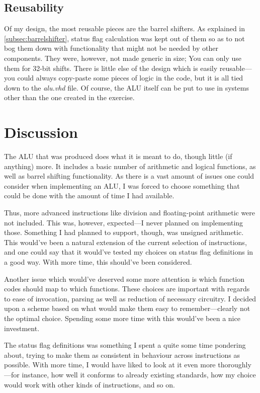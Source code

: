 \documentclass{article}
\begin{document}
\subsection{Reusability}
\label{subsec:reusability}
Of my design, the most reusable pieces are the barrel shifters. As explained in \autoref{subsec:barrelshifter}, status flag calculation was kept out of them so as to not bog them down with functionality that might not be needed by other components. They were, however, not made generic in size; You can only use them for 32-bit shifts. There is little else of the design which is easily reusable---you could always copy-paste some pieces of logic in the code, but it is all tied down to the {\em alu.vhd} file. Of course, the ALU itself can be put to use in systems other than the one created in the exercise.

\section{Discussion}
\label{sec:discussion}
The ALU that was produced does what it is meant to do, though little (if anything) more. It includes a basic number of arithmetic and logical functions, as well as barrel shifting functionality. As there is a vast amount of issues one could consider when implementing an ALU, I was forced to choose something that could be done with the amount of time I had available. 

Thus, more advanced instructions like division and floating-point arithmetic were not included. This was, however, expected---I never planned on implementing those. Something I had planned to support, though, was unsigned arithmetic. This would've been a natural extension of the current selection of instructions, and one could say that it would've tested my choices on status flag definitions in a good way. With more time, this should've been considered.

Another issue which would've deserved some more attention is which function codes should map to which functions. These choices are important with regards to ease of invocation, parsing as well as reduction of necessary circuitry. I decided upon a scheme based on what would make them easy to remember---clearly not the optimal choice. Spending some more time with this would've been a nice investment.

The status flag definitions was something I spent a quite some time pondering about, trying to make them as consistent in behaviour across instructions as possible. With more time, I would have liked to look at it even more thoroughly---for instance, how well it conforms to already existing standards, how my choice would work with other kinds of instructions, and so on.
\end{document}
